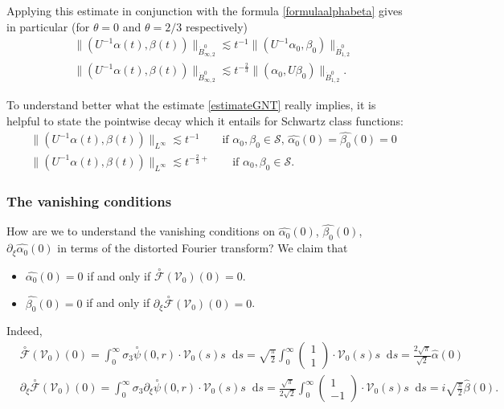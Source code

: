 \documentclass[11 pt]{amsart}
\theoremstyle{definition}
\theoremstyle{remark}
\numberwithin{equation}{section}
\newcommand{\dd}{\mathop{}\!\mathrm{d}}
\begin{document}
Applying this estimate in conjunction with the formula \eqref{formulaalphabeta} gives in particular (for $\theta=0$ and $\theta = 2/3$ respectively)
\begin{align*}
& \| (U^{-1} \alpha (t), \beta(t) ) \|_{\dot{B}^0_{\infty,2}} 
\lesssim  t^{-1} \| (U^{-1} \alpha_0, \beta_0 ) \|_{\dot{B}^0_{1,2}}\\
& \| (U^{-1} \alpha (t), \beta(t) ) \|_{\dot{B}^0_{\infty,2}} 
\lesssim  t^{-\frac 23} \| ( \alpha_0, U \beta_0 ) \|_{\dot{B}^0_{1,2}}.
\end{align*}

To understand better what the estimate \eqref{estimateGNT} really implies, it is helpful to state the pointwise decay which it entails for Schwartz class functions: 
\begin{align*}
& \|  (U^{-1} \alpha (t), \beta(t) ) \|_{L^\infty} \lesssim t^{-1} \qquad \mbox{if $\alpha_0, \beta_0 \in \mathcal{S}$, $\widehat{\alpha_0}(0) = \widehat{\beta_0}(0) = 0$}\\
& \| (U^{-1} \alpha (t), \beta(t) ) \|_{L^\infty} \lesssim t^{-\frac 23 +} \qquad \mbox{if $\alpha_0, \beta_0 \in \mathcal{S}$}.
\end{align*}

\subsubsection{The vanishing conditions}
How are we to understand the vanishing conditions on $\widehat{\alpha_0}(0)$, $\widehat{\beta_0}(0)$, $\partial_\xi \widehat{\alpha_0}(0)$ in terms of the distorted Fourier transform? We claim that
\begin{itemize}
\item $\widehat{\alpha_0}(0)=0$ if and only if $\overset{\circ}{\mathcal{F}}(\mathcal{V}_0)(0) = 0$.
\item $\widehat{\beta_0}(0) =0$ if and only if $\partial_\xi \overset{\circ}{\mathcal{F}}(\mathcal{V}_0)(0) = 0$.
\end{itemize}

Indeed,
\begin{align*}
& \overset{\circ}{\mathcal{F}}(\mathcal{V}_0)(0) = 
 \int_0^\infty 
\sigma_3 \overset{\circ}{\psi}(0,r) \cdot  \mathcal{V}_0(s) s \dd s 
= 
\sqrt{\frac{\pi}{2}} \int_0^\infty \begin{pmatrix}1 \\ 1 \end{pmatrix} \cdot  \mathcal{V}_0(s) s \dd s = {\frac{2\sqrt{\pi}}{\sqrt 2}} \widehat{\alpha}(0) \\
& \partial_\xi \overset{\circ}{\mathcal{F}}(\mathcal{V}_0)(0) =  \int_0^\infty 
\sigma_3 \partial_\xi \overset{\circ}{\psi}(0,r) \cdot  \mathcal{V}_0(s) s \dd s =\frac{\sqrt{\pi}}{2 \sqrt 2} \int_0^\infty \begin{pmatrix}1 \\ -1 \end{pmatrix} \cdot  \mathcal{V}_0(s) s \dd s = i \sqrt{\frac{\pi}{2}} \widehat{\beta}(0).
\end{align*}




\end{document}
